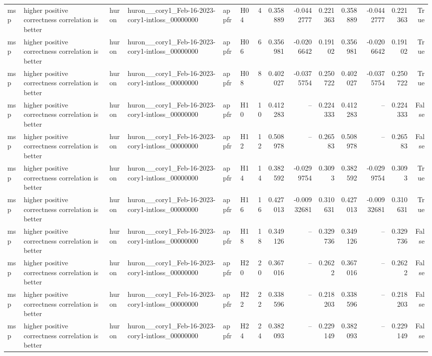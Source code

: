 \begin{longtable}{llllllrrrrrrrr}
msp & higher positive correctness correlation is better & huron & huron\_\_cory1\_Feb-16-2023-cory1-intloss\_00000000 & appfr & H04 & 4 & 0.358889 & -0.0442777 & 0.221363 & 0.358889 & -0.0442777 & 0.221363 & True \\
msp & higher positive correctness correlation is better & huron & huron\_\_cory1\_Feb-16-2023-cory1-intloss\_00000000 & appfr & H06 & 6 & 0.356981 & -0.0206642 & 0.19102 & 0.356981 & -0.0206642 & 0.19102 & True \\
msp & higher positive correctness correlation is better & huron & huron\_\_cory1\_Feb-16-2023-cory1-intloss\_00000000 & appfr & H08 & 8 & 0.402027 & -0.0375754 & 0.250722 & 0.402027 & -0.0375754 & 0.250722 & True \\
msp & higher positive correctness correlation is better & huron & huron\_\_cory1\_Feb-16-2023-cory1-intloss\_00000000 & appfr & H10 & 10 & 0.412283 & -- & 0.224333 & 0.412283 & -- & 0.224333 & False \\
msp & higher positive correctness correlation is better & huron & huron\_\_cory1\_Feb-16-2023-cory1-intloss\_00000000 & appfr & H12 & 12 & 0.508978 & -- & 0.26583 & 0.508978 & -- & 0.26583 & False \\
msp & higher positive correctness correlation is better & huron & huron\_\_cory1\_Feb-16-2023-cory1-intloss\_00000000 & appfr & H14 & 14 & 0.382592 & -0.0299754 & 0.3093 & 0.382592 & -0.0299754 & 0.3093 & True \\
msp & higher positive correctness correlation is better & huron & huron\_\_cory1\_Feb-16-2023-cory1-intloss\_00000000 & appfr & H16 & 16 & 0.427013 & -0.00932681 & 0.310631 & 0.427013 & -0.00932681 & 0.310631 & True \\
msp & higher positive correctness correlation is better & huron & huron\_\_cory1\_Feb-16-2023-cory1-intloss\_00000000 & appfr & H18 & 18 & 0.349126 & -- & 0.329736 & 0.349126 & -- & 0.329736 & False \\
msp & higher positive correctness correlation is better & huron & huron\_\_cory1\_Feb-16-2023-cory1-intloss\_00000000 & appfr & H20 & 20 & 0.367016 & -- & 0.2622 & 0.367016 & -- & 0.2622 & False \\
msp & higher positive correctness correlation is better & huron & huron\_\_cory1\_Feb-16-2023-cory1-intloss\_00000000 & appfr & H22 & 22 & 0.338596 & -- & 0.218203 & 0.338596 & -- & 0.218203 & False \\
msp & higher positive correctness correlation is better & huron & huron\_\_cory1\_Feb-16-2023-cory1-intloss\_00000000 & appfr & H24 & 24 & 0.382093 & -- & 0.229149 & 0.382093 & -- & 0.229149 & False \\

\end{longtable}
